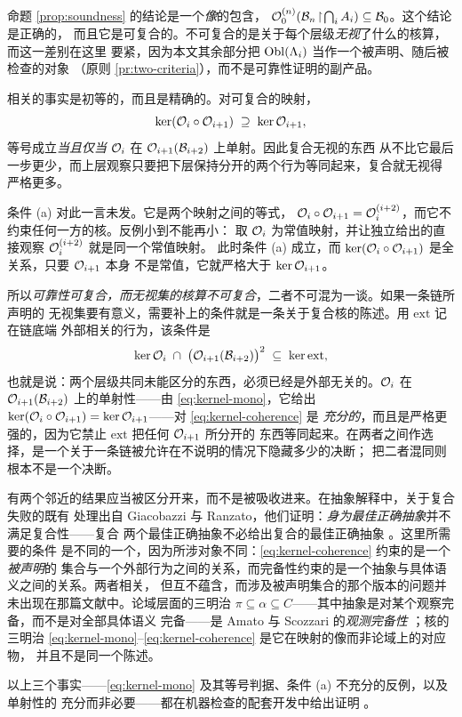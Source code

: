 \begin{remark}\label{rmk:kernel-accounting}
命题 \ref{prop:soundness} 的结论是一个\emph{像}的包含，
$\mathcal{O}_0^{(n)}(\mathcal{B}_n\!\upharpoonright\!\bigcap_i A_i) \subseteq \mathcal{B}_0$。这个结论是正确的，
而且它是可复合的。不可复合的是关于每个层级\emph{无视}了什么的核算，而这一差别在这里
要紧，因为本文其余部分把 $\operatorname{Obl}(\Lambda_i)$ 当作一个被声明、随后被检查的对象
（原则 \ref{pr:two-criteria}），而不是可靠性证明的副产品。

相关的事实是初等的，而且是精确的。对可复合的映射，
\begin{equation}\label{eq:kernel-mono}
\ker(\mathcal{O}_i \circ \mathcal{O}_{i+1}) \;\supseteq\; \ker \mathcal{O}_{i+1},
\end{equation}
等号成立\emph{当且仅当} $\mathcal{O}_i$ 在 $\mathcal{O}_{i+1}(\mathcal{B}_{i+2})$ 上单射。因此复合无视的东西
从不比它最后一步更少，而上层观察只要把下层保持分开的两个行为等同起来，复合就无视得
严格更多。

条件 (a) 对此一言未发。它是两个映射之间的等式，
$\mathcal{O}_i \circ \mathcal{O}_{i+1} = \mathcal{O}_i^{(i+2)}$，而它不约束任何一方的核。反例小到不能再小：
取 $\mathcal{O}_i$ 为常值映射，并让独立给出的直接观察 $\mathcal{O}_i^{(i+2)}$ 就是同一个常值映射。
此时条件 (a) 成立，而 $\ker(\mathcal{O}_i \circ \mathcal{O}_{i+1})$ 是全关系，只要 $\mathcal{O}_{i+1}$ 本身
不是常值，它就严格大于 $\ker\mathcal{O}_{i+1}$。

所以\emph{可靠性可复合，而无视集的核算不可复合}，二者不可混为一谈。如果一条链所声明的
无视集要有意义，需要补上的条件就是一条关于复合核的陈述。用 $\mathrm{ext}$ 记在链底端
外部相关的行为，该条件是
\begin{equation}\label{eq:kernel-coherence}
\ker \mathcal{O}_i \;\cap\; \bigl(\mathcal{O}_{i+1}(\mathcal{B}_{i+2})\bigr)^{2} \;\subseteq\; \ker \mathrm{ext},
\end{equation}
也就是说：两个层级共同未能区分的东西，必须已经是外部无关的。$\mathcal{O}_i$ 在
$\mathcal{O}_{i+1}(\mathcal{B}_{i+2})$ 上的单射性——由 \eqref{eq:kernel-mono}，它给出
$\ker(\mathcal{O}_i \circ \mathcal{O}_{i+1}) = \ker\mathcal{O}_{i+1}$——对 \eqref{eq:kernel-coherence} 是
\emph{充分的}，而且是严格更强的，因为它禁止 $\mathrm{ext}$ 把任何 $\mathcal{O}_{i+1}$ 所分开的
东西等同起来。在两者之间作选择，是一个关于一条链被允许在不说明的情况下隐藏多少的决断；
把二者混同则根本不是一个决断。

有两个邻近的结果应当被区分开来，而不是被吸收进来。在抽象解释中，关于复合失败的既有
处理出自 Giacobazzi 与 Ranzato，他们证明：\emph{身为最佳正确抽象}并不满足复合性——复合
两个最佳正确抽象不必给出复合的最佳正确抽象 \cite{giacobazzi2025}。这里所需要的条件
是不同的一个，因为所涉对象不同：\eqref{eq:kernel-coherence} 约束的是一个\emph{被声明}的
集合与一个外部行为之间的关系，而完备性约束的是一个抽象与具体语义之间的关系。两者相关，
但互不蕴含，而涉及被声明集合的那个版本的问题并未出现在那篇文献中。论域层面的三明治
$\pi \subseteq \alpha \subseteq C$——其中抽象是对某个观察完备，而不是对全部具体语义
完备——是 Amato 与 Scozzari 的\emph{观测完备性} \cite{amato2011}；核的三明治
\eqref{eq:kernel-mono}--\eqref{eq:kernel-coherence} 是它在映射的像而非论域上的对应物，
并且不是同一个陈述。

以上三个事实——\eqref{eq:kernel-mono} 及其等号判据、条件 (a) 不充分的反例，以及单射性的
充分而非必要——都在机器检查的配套开发中给出证明 \cite{assaylean}。
\end{remark}


